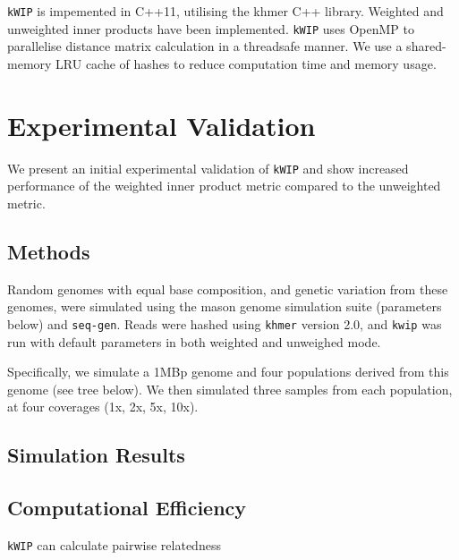 \documentclass[a0,portrait]{a0poster}
\begin{document}
\begin{multicols}{2}
\texttt{kWIP} is impemented in C++11, utilising the khmer C++ library. Weighted
and unweighted inner products have been implemented. \texttt{kWIP} uses OpenMP
to parallelise distance matrix calculation in a threadsafe manner. We use
a shared-memory LRU cache of hashes to reduce computation time and memory
usage.


\section*{Experimental Validation}

We present an initial experimental validation of \texttt{kWIP} and show
increased performance of the weighted inner product metric compared to the
unweighted metric.

\subsection*{Methods}

Random genomes with equal base composition, and genetic variation from these
genomes, were simulated using the mason genome simulation suite (parameters
below) and \texttt{seq-gen}. Reads were hashed using \texttt{khmer} version
2.0, and \texttt{kwip} was run with default parameters in both weighted and
unweighed mode.

Specifically, we simulate a 1MBp genome and four populations derived from this
genome (see tree below). We then simulated three samples from each population,
at four coverages (1x, 2x, 5x, 10x).

\subsection*{Simulation Results}


\subsection*{Computational Efficiency}

\texttt{kWIP} can calculate pairwise relatedness 



\end{multicols}
\end{document}
